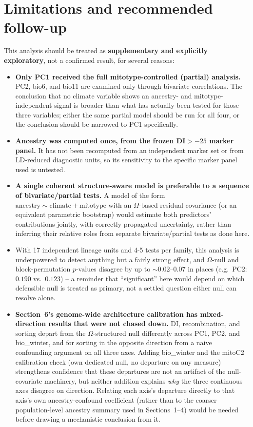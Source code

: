 \documentclass[11pt]{article}
\begin{document}
\section*{\color{Accent}Limitations and recommended follow-up}\label{sec:limitations}
This analysis should be treated as \textbf{supplementary and explicitly exploratory}, not a
confirmed result, for several reasons:
\begin{itemize}
  \item \textbf{Only PC1 received the full mitotype-controlled (partial) analysis.} PC2,
    bio6, and bio11 are examined only through bivariate correlations. The conclusion that no
    climate variable shows an ancestry- and mitotype-independent signal is broader than what
    has actually been tested for those three variables; either the same partial model should
    be run for all four, or the conclusion should be narrowed to PC1 specifically.
  \item \textbf{Ancestry was computed once, from the frozen DI$>-25$ marker panel.} It has
    not been recomputed from an independent marker set or from LD-reduced diagnostic units,
    so its sensitivity to the specific marker panel used is untested.
  \item \textbf{A single coherent structure-aware model is preferable to a sequence of
    bivariate/partial tests.} A model of the form
    $\mathrm{ancestry} \sim \mathrm{climate} + \mathrm{mitotype}$ with an $\Omega$-based
    residual covariance (or an equivalent parametric bootstrap) would estimate both
    predictors' contributions jointly, with correctly propagated uncertainty, rather than
    inferring their relative roles from separate bivariate/partial tests as done here.
  \item With 17 independent lineage units and 4-5 tests per family, this analysis is
    underpowered to detect anything but a fairly strong effect, and $\Omega$-null and
    block-permutation $p$-values disagree by up to $\sim$0.02--0.07 in places (e.g.\ PC2:
    $0.190$ vs.\ $0.123$) -- a reminder that ``significant'' here would depend on which
    defensible null is treated as primary, not a settled question either null can resolve
    alone.
  \item \textbf{Section~6's genome-wide architecture calibration has mixed-direction results
    that were not chased down.} DI, recombination, and sorting depart from the
    $\Omega$-structured null differently across PC1, PC2, and bio\_winter, and for sorting in
    the opposite direction from a naive confounding argument on all three axes. Adding
    bio\_winter and the mitoC2 calibration check (own dedicated null, no departure on any
    measure) strengthens confidence that these departures are not an artifact of the
    null-covariate machinery, but neither addition explains \emph{why} the three continuous
    axes disagree on direction. Relating each axis's departure directly to that axis's own
    ancestry-confound coefficient (rather than to the coarser population-level ancestry
    summary used in Sections~1--4) would be needed before drawing a mechanistic conclusion
    from it.
\end{itemize}
\end{document}
